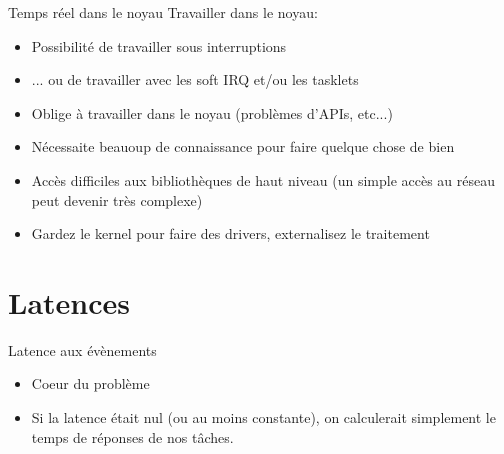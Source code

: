 \begin{frame}{Temps réel dans le noyau}
  Travailler dans le noyau:
  \begin{itemize}
  \item Possibilité de travailler sous interruptions
  \item ... ou de travailler avec les soft IRQ et/ou les tasklets
  \item Oblige à travailler dans le noyau (problèmes d'APIs, etc...)
  \item Nécessaite beauoup de connaissance pour faire quelque chose de bien
  \item Accès  difficiles aux bibliothèques de haut  niveau (un simple
    accès au réseau peut devenir très complexe)
  \item  Gardez le  kernel  pour faire  des  drivers, externalisez  le
    traitement
  \end{itemize}
\end{frame}






\section{Latences}

\begin{frame}{Latence aux évènements}
  \begin{itemize}
    \item Coeur du problème
    \item Si la latence était  nul (ou au moins constante), on calculerait
      simplement le temps de réponses de nos tâches.
  \end{itemize}

  \begin{center}
    
  \end{center}
\end{frame}

